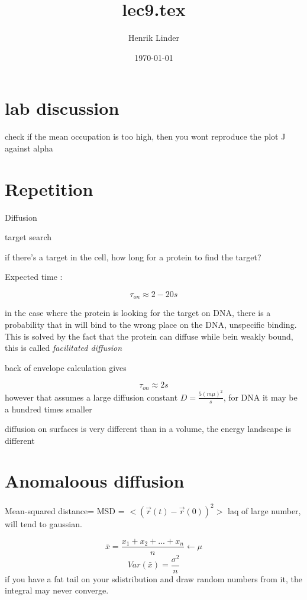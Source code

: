 \documentclass{article}
\title{lec9.tex }
\author{Henrik Linder}
\date{\today}
\begin{document}
\maketitle


\section{lab discussion}
check if the mean occupation is too high, then you wont reproduce the plot J against alpha

\section{Repetition}
Diffusion

target search 

if there's a target in the cell, how long for a protein to find the target? 

Expected time : 

\begin{equation}
	\tau_{on}  \approx 2 - 20 s
\end{equation}

in the case where the protein is looking for the target on DNA, there is a probability that in will bind to the wrong place on the DNA, unspecific binding. This is solved by the fact that the protein can diffuse while bein weakly bound, this is called \textit{facilitated diffusion}

back of envelope calculation gives 

\begin{equation}
	\tau_{on} \approx 2 s
\end{equation}
however that assumes a large diffusion constant $D = \frac{5(m\mu)^2}{s}$, for DNA it may be a hundred times smaller

diffusion on surfaces is very different than in a volume, the energy landscape is different



\section{Anomaloous diffusion}
Mean-squared distance= MSD = $<(\vec r(t) - \vec r(0))^2>$
laq of large number, will tend to gaussian.

\begin{equation}
	\bar x = \frac{x_1 + x_2 + ... + x_n}{n}\leftarrow \mu
\end{equation}
\begin{equation}
	Var (\bar x) = \frac{\sigma ^2}{n}
\end{equation}
if you have a fat tail on your sdistribution and draw random numbers from it, the integral  may never converge.
\end{document}
